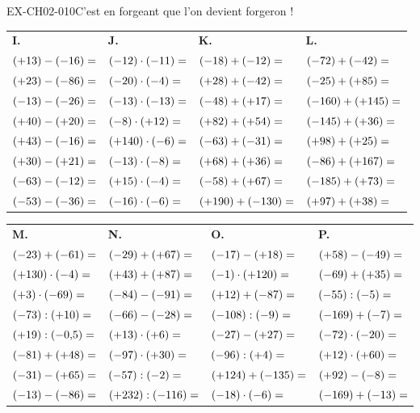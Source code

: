 \documentclass[12pt, a4paper]{article}
\begin{document}
\begin{exercice}{EX-CH02-010}{C’est en forgeant que l’on devient forgeron !}
{\bigskip
\begin{tabularx}{\linewidth}{*{4}{X}}
\textbf{I.} & \textbf{J.} & \textbf{K.} & \textbf{L.} \\
$(+13)-(-16)= \dotfill$ & $(-12)\cdot(-11)= \dotfill$ & $(-18)+(-12)= \dotfill$ & $(-72)+(-42)= \dotfill$ \\
$(+23)-(-86)= \dotfill$ & $(-20)\cdot(-4)= \dotfill$ & $(+28)+(-42)= \dotfill$ & $(-25)+(+85)= \dotfill$ \\
$(-13)-(-26)= \dotfill$ & $(-13)\cdot(-13)= \dotfill$ & $(-48)+(+17)= \dotfill$ & $(-160)+(+145)= \dotfill$ \\
$(+40)-(+20)= \dotfill$ & $(-8)\cdot(+12)= \dotfill$ & $(+82)+(+54)= \dotfill$ & $(-145)+(+36)= \dotfill$ \\
$(+43)-(-16)= \dotfill$ & $(+140)\cdot(-6)= \dotfill$ & $(-63)+(-31)= \dotfill$ & $(+98)+(+25)= \dotfill$ \\
$(+30)-(+21)= \dotfill$ & $(-13)\cdot(-8)= \dotfill$ & $(+68)+(+36)= \dotfill$ & $(-86)+(+167)= \dotfill$ \\
$(-63)-(-12)= \dotfill$ & $(+15)\cdot(-4)= \dotfill$ & $(-58)+(+67)= \dotfill$ & $(-185)+(+73)= \dotfill$ \\
$(-53)-(-36)= \dotfill$ & $(-16)\cdot(-6)= \dotfill$ & $(+190)+(-130)= \dotfill$ & $(+97)+(+38)= \dotfill$ \\
\end{tabularx}

\bigskip
\begin{tabularx}{\linewidth}{*{4}{X}}
\textbf{M.} & \textbf{N.} & \textbf{O.} & \textbf{P.} \\
$(-23)+(-61)= \dotfill$ & $(-29)+(+67)= \dotfill$ & $(-17)-(+18)= \dotfill$ & $(+58)-(-49)= \dotfill$ \\
$(+130)\cdot(-4)= \dotfill$ & $(+43)+(+87)= \dotfill$ & $(-1)\cdot(+120)= \dotfill$ & $(-69)+(+35)= \dotfill$ \\
$(+3)\cdot(-69)= \dotfill$ & $(-84)-(-91)= \dotfill$ & $(+12)+(-87)= \dotfill$ & $(-55):(-5)= \dotfill$ \\
$(-73):(+10)= \dotfill$ & $(-66)-(-28)= \dotfill$ & $(-108):(-9)= \dotfill$ & $(-169)+(-7)= \dotfill$ \\
$(+19):(-0{,}5)= \dotfill$ & $(+13)\cdot(+6)= \dotfill$ & $(-27)-(+27)= \dotfill$ & $(-72)\cdot(-20)= \dotfill$ \\
$(-81)+(+48)= \dotfill$ & $(-97)\cdot(+30)= \dotfill$ & $(-96):(+4)= \dotfill$ & $(+12)\cdot(+60)= \dotfill$ \\
$(-31)-(+65)= \dotfill$ & $(-57):(-2)= \dotfill$ & $(+124)+(-135)= \dotfill$ & $(+92)-(-8)= \dotfill$ \\
$(-13)-(-86)= \dotfill$ & $(+232):(-116)= \dotfill$ & $(-18)\cdot(-6)= \dotfill$ & $(-169)+(-13)= \dotfill$ \\
\end{tabularx}}

\end{exercice}
\end{document}
